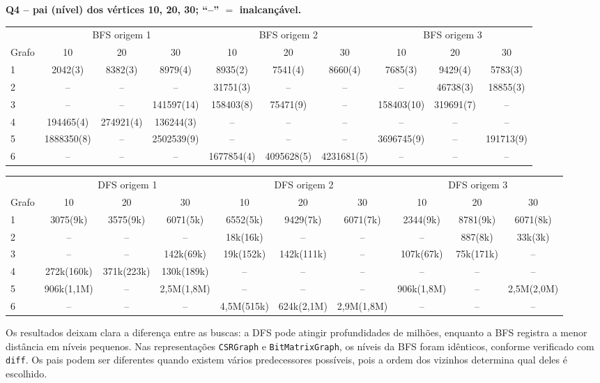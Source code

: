 \documentclass[11pt,a4paper]{article}
\begin{document}
\textbf{Q4 -- pai (n\'ivel) dos v\'ertices 10, 20, 30; ``--'' $=$ inalcan\c c\'avel.}
\begin{center}\scriptsize\setlength{\tabcolsep}{3pt}
\begin{tabular}{lccccccccc}
\toprule
 & \multicolumn{3}{c}{BFS origem 1} & \multicolumn{3}{c}{BFS origem 2} & \multicolumn{3}{c}{BFS origem 3} \\
Grafo & 10 & 20 & 30 & 10 & 20 & 30 & 10 & 20 & 30 \\
\midrule
1 & 2042(3) & 8382(3) & 8979(4) & 8935(2) & 7541(4) & 8660(4) & 7685(3) & 9429(4) & 5783(3) \\
2 & -- & -- & -- & 31751(3) & -- & -- & -- & 46738(3) & 18855(3) \\
3 & -- & -- & 141597(14) & 158403(8) & 75471(9) & -- & 158403(10) & 319691(7) & -- \\
4 & 194465(4) & 274921(4) & 136244(3) & -- & -- & -- & -- & -- & -- \\
5 & 1888350(8) & -- & 2502539(9) & -- & -- & -- & 3696745(9) & -- & 191713(9) \\
6 & -- & -- & -- & 1677854(4) & 4095628(5) & 4231681(5) & -- & -- & -- \\
\bottomrule
\end{tabular}
\end{center}
\begin{center}\scriptsize\setlength{\tabcolsep}{3pt}
\begin{tabular}{lccccccccc}
\toprule
 & \multicolumn{3}{c}{DFS origem 1} & \multicolumn{3}{c}{DFS origem 2} & \multicolumn{3}{c}{DFS origem 3} \\
Grafo & 10 & 20 & 30 & 10 & 20 & 30 & 10 & 20 & 30 \\
\midrule
1 & 3075(9k) & 3575(9k) & 6071(5k) & 6552(5k) & 9429(7k) & 6071(7k) & 2344(9k) & 8781(9k) & 6071(8k) \\
2 & -- & -- & -- & 18k(16k) & -- & -- & -- & 887(8k) & 33k(3k) \\
3 & -- & -- & 142k(69k) & 19k(152k) & 142k(111k) & -- & 107k(67k) & 75k(171k) & -- \\
4 & 272k(160k) & 371k(223k) & 130k(189k) & -- & -- & -- & -- & -- & -- \\
5 & 906k(1,1M) & -- & 2,5M(1,8M) & -- & -- & -- & 906k(1,8M) & -- & 2,5M(2,0M) \\
6 & -- & -- & -- & 4,5M(515k) & 624k(2,1M) & 2,9M(1,8M) & -- & -- & -- \\
\bottomrule
\end{tabular}
\end{center}
Os resultados deixam clara a diferen\c ca entre as buscas: a DFS pode atingir
profundidades de milh\~oes, enquanto a BFS registra a menor dist\^ancia em n\'iveis
pequenos. Nas representa\c c\~oes \texttt{CSRGraph} e \texttt{BitMatrixGraph}, os
n\'iveis da BFS foram id\^enticos, conforme verificado com \texttt{diff}. Os pais podem
ser diferentes quando existem v\'arios predecessores poss\'iveis, pois a ordem dos
vizinhos determina qual deles \'e escolhido.
\end{document}
